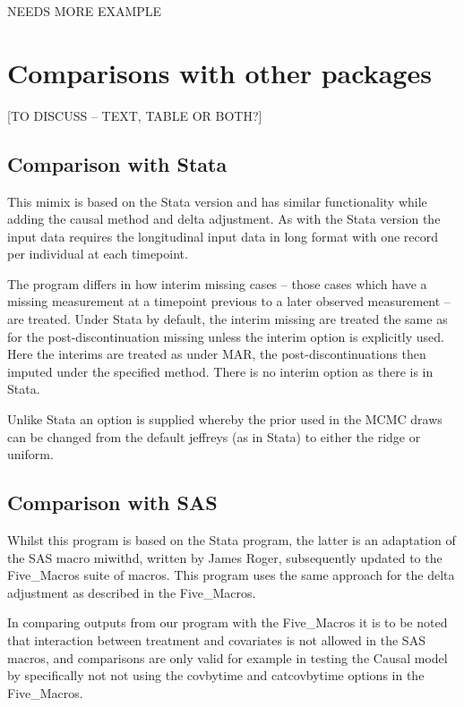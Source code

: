 NEEDS MORE EXAMPLE


\section{Comparisons with other packages}

[TO DISCUSS -- TEXT, TABLE OR BOTH?]

\subsection{Comparison with Stata}
This mimix is based on the Stata version and has similar functionality while adding
the causal method and delta adjustment. 
As with the Stata version the input data requires the longitudinal input data in
long format with one record per individual at each timepoint.

The program differs in how interim missing cases -- those cases which 
have a missing measurement at a timepoint previous to a later observed measurement -- are treated.        
Under Stata by default, the interim missing are treated the same as for the post-discontinuation
missing unless the interim option is explicitly used. 
Here the interims are treated as under MAR, the post-discontinuations then imputed under
the specified method. There is no interim option as there is in Stata.

Unlike Stata an option is supplied whereby the prior used in the MCMC draws can be changed from the 
default jeffreys (as in Stata) to either the ridge or uniform.

\subsection{Comparison with SAS}

Whilst this program is based on the Stata program, the latter is an adaptation of the SAS macro miwithd,
written by James Roger, subsequently updated to the Five\_Macros suite of macros.
This program uses the same approach for the delta adjustment as described in the Five\_Macros.

In comparing outputs from our program with the Five\_Macros it is to be noted that interaction between treatment and covariates
is not allowed in the SAS macros, and comparisons are only valid for example in testing the Causal model by specifically not
not using the covbytime and catcovbytime options in the Five\_Macros.

